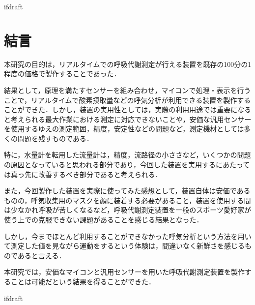 \expandafter\ifx\csname ifdraft\endcsname\relax
 
\fi

\section{結言}

本研究の目的は，リアルタイムでの呼吸代謝測定が行える装置を既存の100分の1程度の価格で製作することであった．

結果として，原理を満たすセンサーを組み合わせ，マイコンで処理・表示を行うことで，リアルタイムで酸素摂取量などの呼気分析が利用できる装置を製作することができた．しかし，装置の実用性としては，実際の利用用途では重要になると考えられる最大作業における測定に対応できないことや，安価な汎用センサーを使用するゆえの測定範囲，精度，安定性などの問題など，測定機材としては多くの問題を残すものである．

特に，水量計を転用した流量計は，精度，流路径の小ささなど，いくつかの問題の原因となっていると思われる部分であり，今回した装置を実用するにあたっては真っ先に改善するべき部分であると考えられる．

また，今回製作した装置を実際に使ってみた感想として，装置自体は安価であるものの，呼気収集用のマスクを顔に装着する必要があること，装置を使用する間は少なかれ呼吸が苦しくなるなど，呼吸代謝測定装置を一般のスポーツ愛好家が使う上での克服できない課題があることを感じる結果となった．

しかし，今までほとんど利用することができなかった呼気分析という方法を用いて測定した値を見ながら運動をするという体験は，間違いなく新鮮さを感じるものであると言える．

本研究では，安価なマイコンと汎用センサーを用いた呼吸代謝測定装置を製作することは可能だという結果を得ることができた．

\expandafter\ifx\csname ifdraft\endcsname\relax
  
\fi
